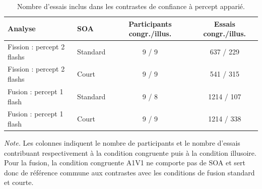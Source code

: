 \begin{table}[ht]
\centering
\caption{Nombre d’essais inclus dans les contrastes de confiance à percept apparié.}
\label{tab:matched_confidence_trial_counts}
\footnotesize
\begin{tabular}{llcc}
\toprule
Analyse & SOA & Participants congr./illus. & Essais congr./illus. \\
\midrule
Fission : percept 2 flashs & Standard & 9 / 9 & 637 / 229 \\
Fission : percept 2 flashs & Court & 9 / 9 & 541 / 315 \\
Fusion : percept 1 flash & Standard & 9 / 8 & 1214 / 107 \\
Fusion : percept 1 flash & Court & 9 / 9 & 1214 / 338 \\
\bottomrule
\end{tabular}

\vspace{0.2cm}
\begin{minipage}{0.92\textwidth}
\footnotesize
\textit{Note.} Les colonnes indiquent le nombre de participants et le nombre d’essais contribuant respectivement à la condition congruente puis à la condition illusoire. Pour la fusion, la condition congruente A1V1 ne comporte pas de SOA et sert donc de référence commune aux contrastes avec les conditions de fusion standard et courte.
\end{minipage}
\end{table}
